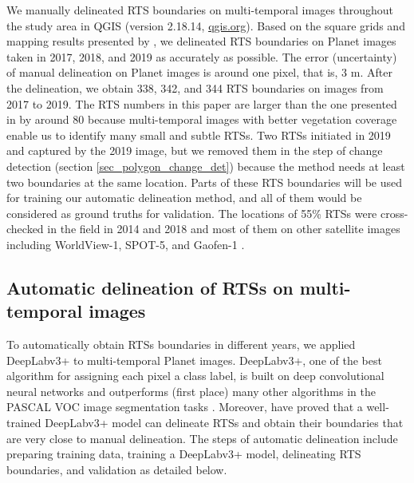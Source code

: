 \documentclass[authoryear,preprint,review,12pt]{elsarticle}
\begin{document}
We manually delineated RTS boundaries on multi-temporal images throughout the study area in QGIS (version 2.18.14, \url{qgis.org}). 
Based on the square grids and mapping results presented by \cite{huang2020using}, we delineated RTS boundaries on Planet images taken in 2017, 2018, and 2019 as accurately as possible. 
The error (uncertainty) of manual delineation on Planet images is around one pixel, that is, 3 m. 
After the delineation, we obtain 338, 342, and 344 RTS boundaries on images from 2017 to 2019. 
The RTS numbers in this paper are larger than the one presented in \cite{huang2020using} by around 80 because multi-temporal images with better vegetation coverage enable us to identify many small and subtle RTSs. 
Two RTSs initiated in 2019 and captured by the 2019 image, but we removed them in the step of change detection (section \ref{sec_polygon_change_det}) because the method needs at least two boundaries at the same location. 
Parts of these RTS boundaries will be used for training our automatic delineation method, and all of them would be considered as ground truths for validation.%
The locations of 55\% RTSs were cross-checked in the field in 2014 and 2018 and most of them on other satellite images including WorldView-1, SPOT-5, and Gaofen-1 \citep{luo2019recent}. 
%



\subsection{Automatic delineation of RTSs on multi-temporal images}
\label{sec_auto_delineating}

To automatically obtain RTSs boundaries in different years, we applied DeepLabv3+ to multi-temporal Planet images. 
DeepLabv3+, one of the best algorithm for assigning each pixel a class label, is built on deep convolutional neural networks \citep{chen2018encoder-decoder} and outperforms (first place) many other algorithms in the PASCAL VOC image segmentation tasks \citep{everingham2015The}.
Moreover, \cite{huang2020using} have proved that a well-trained DeepLabv3+ model can delineate RTSs and obtain their boundaries that are very close to manual delineation.
The steps of automatic delineation include preparing training data, training a DeepLabv3+ model, delineating RTS boundaries, and validation as detailed below. 
\end{document}
